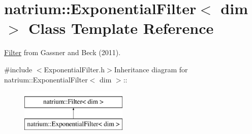 \hypertarget{classnatrium_1_1ExponentialFilter}{
\section{natrium::ExponentialFilter$<$ dim $>$ Class Template Reference}
\label{classnatrium_1_1ExponentialFilter}
}


\hyperlink{classnatrium_1_1Filter}{Filter} from Gassner and Beck (2011).  


{\ttfamily \#include $<$ExponentialFilter.h$>$}Inheritance diagram for natrium::ExponentialFilter$<$ dim $>$::\begin{figure}[H]
\begin{center}
\leavevmode
\includegraphics[height=2cm]{classnatrium_1_1ExponentialFilter}
\end{center}
\end{figure}
